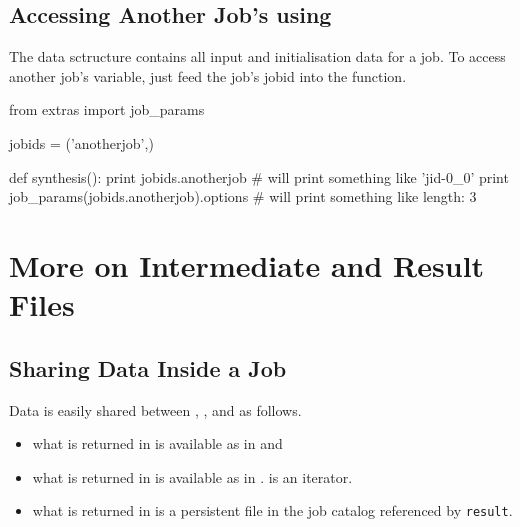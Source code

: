 \subsection{Accessing Another Job's \params using \jobparams}

The \params data sctructure contains all input and initialisation data
for a job.  To access another job's \params variable, just feed the
job's jobid into the \jobparams function.
\\
\begin{python}
from extras import job_params

jobids = ('anotherjob',)

def synthesis():
  print jobids.anotherjob
  # will print something like 'jid-0_0'
  print job_params(jobids.anotherjob).options
  # will print something like {length: 3}
\end{python}




\newpage
\section{More on Intermediate and Result Files}

\subsection{Sharing Data Inside a Job}
Data is easily shared between \prepare, \analysis, and \synthesis as
follows.
\begin{itemize}
\item what is returned in \prepare is available as \prepareres in \analysis and \synthesis
\item what is returned in \analysis is available as \analysisres in \synthesis.  \analysisres is an iterator.
\item what is returned in \synthesis is a persistent file in the job catalog referenced by \texttt{result}.
\end{itemize}

